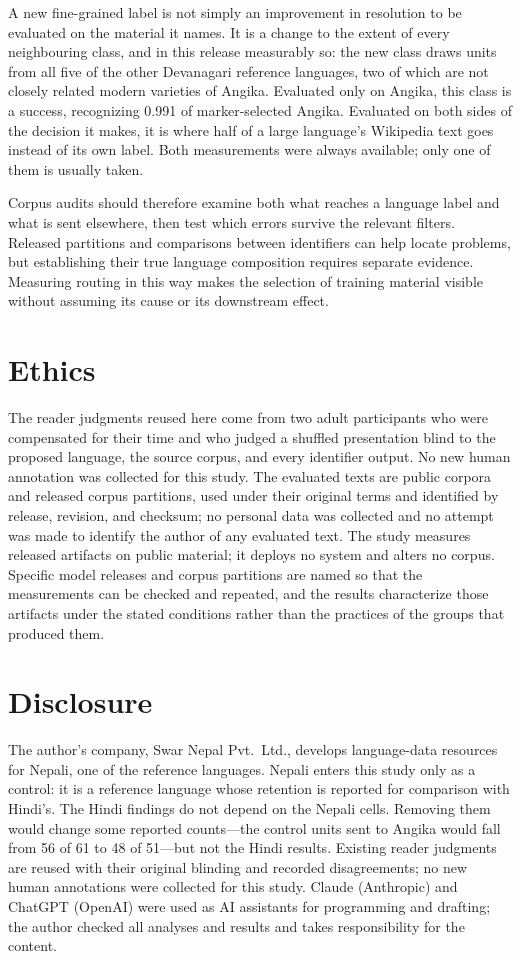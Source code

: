 \documentclass[final]{clv2025}
\begin{document}
A new fine-grained label is not simply an improvement in resolution to be evaluated on the material it names. It is a change to the extent of every neighbouring class, and in this release measurably so: the new class draws units from all five of the other Devanagari reference languages, two of which are not closely related modern varieties of Angika. Evaluated only on Angika, this class is a success, recognizing 0.991 of marker-selected Angika. Evaluated on both sides of the decision it makes, it is where half of a large language's Wikipedia text goes instead of its own label. Both measurements were always available; only one of them is usually taken.

Corpus audits should therefore examine both what reaches a language label and what is sent elsewhere, then test which errors survive the relevant filters. Released partitions and comparisons between identifiers can help locate problems, but establishing their true language composition requires separate evidence. Measuring routing in this way makes the selection of training material visible without assuming its cause or its downstream effect.

\section*{Ethics}
The reader judgments reused here come from two adult participants who were compensated for their time and who judged a shuffled presentation blind to the proposed language, the source corpus, and every identifier output. No new human annotation was collected for this study. The evaluated texts are public corpora and released corpus partitions, used under their original terms and identified by release, revision, and checksum; no personal data was collected and no attempt was made to identify the author of any evaluated text. The study measures released artifacts on public material; it deploys no system and alters no corpus. Specific model releases and corpus partitions are named so that the measurements can be checked and repeated, and the results characterize those artifacts under the stated conditions rather than the practices of the groups that produced them.

\section*{Disclosure}
The author's company, Swar Nepal Pvt.\ Ltd., develops language-data resources for Nepali, one of the reference languages. Nepali enters this study only as a control: it is a reference language whose retention is reported for comparison with Hindi's. The Hindi findings do not depend on the Nepali cells. Removing them would change some reported counts---the control units sent to Angika would fall from 56 of 61 to 48 of 51---but not the Hindi results. Existing reader judgments are reused with their original blinding and recorded disagreements; no new human annotations were collected for this study. Claude (Anthropic) and ChatGPT (OpenAI) were used as AI assistants for programming and drafting; the author checked all analyses and results and takes responsibility for the content.
\end{document}
